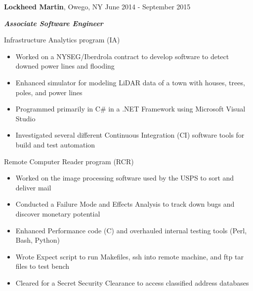 
\vspace{5pt}

\textbf{Lockheed Martin}, Owego, NY \hfill June 2014 - September 2015

\textbf{\textit{Associate Software Engineer}}

\vspace{3pt}

Infrastructure Analytics program (IA)

\begin{itemize}
    \item Worked on a NYSEG/Iberdrola contract to develop software to detect downed power lines and flooding
    \item Enhanced simulator for modeling LiDAR data of a town with houses, trees, poles, and power lines
    \item Programmed primarily in C\# in a .NET Framework using Microsoft Visual Studio
    \item Investigated several different Continuous Integration (CI) software tools for build and test automation
\end{itemize}

\vspace{3pt}

Remote Computer Reader program (RCR)

\begin{itemize}
    \item Worked on the image processing software used by the USPS to sort and deliver mail
    \item Conducted a Failure Mode and Effects Analysis to track down bugs and discover monetary potential
    \item Enhanced Performance code (C) and overhauled internal testing tools (Perl, Bash, Python)
    \item Wrote Expect script to run Makefiles, ssh into remote machine, and ftp tar files to test bench
    \item Cleared for a Secret Security Clearance to access classified address databases
\end{itemize}
